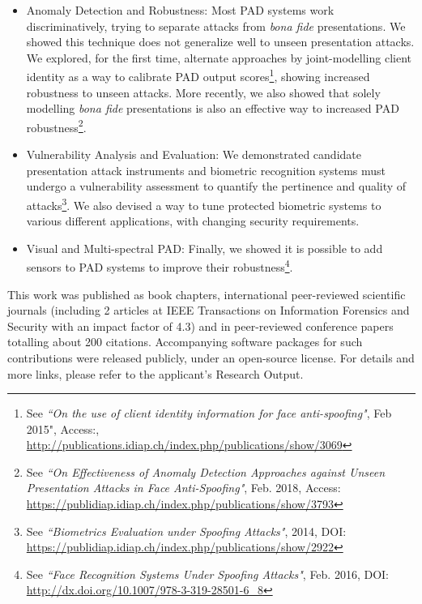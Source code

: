 \documentclass[a4paper,10pt,onecolumn]{article}
\begin{document}
\begin{itemize}
  \item Anomaly Detection and Robustness: Most PAD systems work
    discriminatively, trying to separate attacks from \textit{bona fide}
    presentations.  We showed this technique does not generalize well to unseen
    presentation attacks.  We explored, for the first time, alternate
    approaches by joint-modelling client identity as a way to calibrate PAD
    output scores\footnote{See \textit{``On the use of client identity
    information for face anti-spoofing"}, Feb 2015", Access:,
    \url{http://publications.idiap.ch/index.php/publications/show/3069}},
    showing increased robustness to unseen attacks.  More recently, we also
    showed that solely modelling \textit{bona fide} presentations is also an
    effective way to increased PAD robustness\footnote{See \textit{``On
    Effectiveness of Anomaly Detection Approaches against Unseen Presentation
    Attacks in Face Anti-Spoofing"}, Feb. 2018, Access:
    \url{https://publidiap.idiap.ch/index.php/publications/show/3793}}.

  \item Vulnerability Analysis and Evaluation: We demonstrated candidate
    presentation attack instruments and biometric recognition systems must
    undergo a vulnerability assessment to quantify the pertinence and quality
    of attacks\footnote{See \textit{``Biometrics Evaluation under Spoofing
    Attacks"}, 2014, DOI:
    \url{https://publidiap.idiap.ch/index.php/publications/show/2922}}.  We
    also devised a way to tune protected biometric systems to various different
    applications, with changing security requirements.

  \item Visual and Multi-spectral PAD: Finally, we showed it is possible to
    add sensors to PAD systems to improve their robustness\footnote{See
    \textit{``Face Recognition Systems Under Spoofing Attacks"}, Feb. 2016, DOI:
    \url{http://dx.doi.org/10.1007/978-3-319-28501-6_8}}.
\end{itemize}

This work was published as book chapters, international peer-reviewed
scientific journals (including 2 articles at IEEE Transactions on Information
Forensics and Security with an impact factor of 4.3) and in peer-reviewed
conference papers totalling about 200 citations.  Accompanying software
packages for such contributions were released publicly, under an open-source
license. For details and more links, please refer to the applicant's Research
Output.
\end{document}
